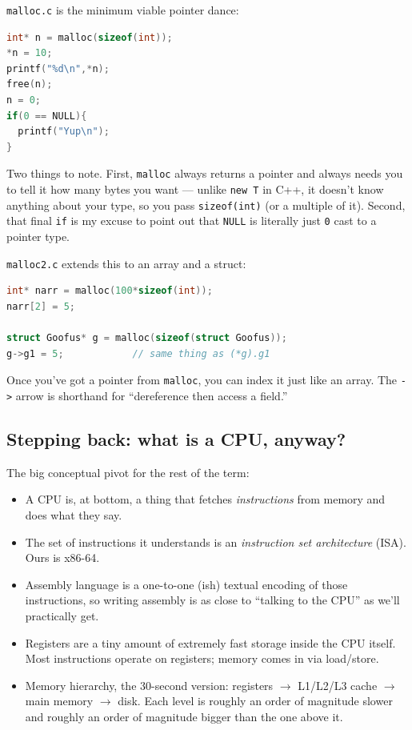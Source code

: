 \documentclass[11pt]{article}
\begin{document}
\texttt{malloc.c} is the minimum viable pointer dance:

\begin{lstlisting}[language=C]
int* n = malloc(sizeof(int));
*n = 10;
printf("%d\n",*n);
free(n);
n = 0;
if(0 == NULL){
  printf("Yup\n");
}
\end{lstlisting}

Two things to note. First, \texttt{malloc} always returns a pointer
and always needs you to tell it how many bytes you want --- unlike
\texttt{new T} in C++, it doesn't know anything about your type, so
you pass \texttt{sizeof(int)} (or a multiple of it). Second, that
final \texttt{if} is my excuse to point out that \texttt{NULL} is
literally just \texttt{0} cast to a pointer type.

\texttt{malloc2.c} extends this to an array and a struct:

\begin{lstlisting}[language=C]
int* narr = malloc(100*sizeof(int));
narr[2] = 5;

struct Goofus* g = malloc(sizeof(struct Goofus));
g->g1 = 5;            // same thing as (*g).g1
\end{lstlisting}

Once you've got a pointer from \texttt{malloc}, you can index it just
like an array. The \texttt{->} arrow is shorthand for ``dereference
then access a field.''

\subsection*{Stepping back: what is a CPU, anyway?}

The big conceptual pivot for the rest of the term:
\begin{itemize}
  \item A CPU is, at bottom, a thing that fetches \emph{instructions}
    from memory and does what they say.
  \item The set of instructions it understands is an \emph{instruction
    set architecture} (ISA). Ours is x86-64.
  \item Assembly language is a one-to-one (ish) textual encoding of
    those instructions, so writing assembly is as close to ``talking
    to the CPU'' as we'll practically get.
  \item Registers are a tiny amount of extremely fast storage inside
    the CPU itself. Most instructions operate on registers; memory
    comes in via load/store.
  \item Memory hierarchy, the 30-second version: registers $\to$
    L1/L2/L3 cache $\to$ main memory $\to$ disk. Each level is
    roughly an order of magnitude slower and roughly an order of
    magnitude bigger than the one above it.
\end{itemize}
\end{document}
